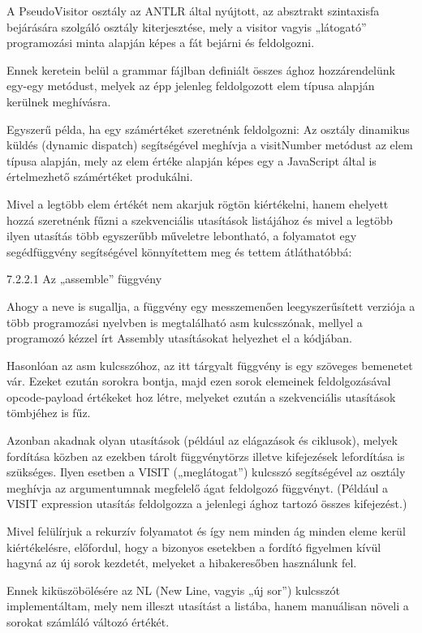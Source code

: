 A PseudoVisitor osztály az ANTLR által nyújtott, az absztrakt szintaxisfa bejárására szolgáló osztály kiterjesztése, mely a visitor vagyis „látogató” programozási minta alapján képes a fát bejárni és feldolgozni.

Ennek keretein belül a grammar fájlban definiált összes ághoz hozzárendelünk egy-egy metódust, melyek az épp jelenleg feldolgozott elem típusa alapján kerülnek meghívásra.

Egyszerű példa, ha egy számértéket szeretnénk feldolgozni: Az osztály dinamikus küldés (dynamic dispatch) segítségével meghívja a visitNumber metódust az elem típusa alapján, mely az elem értéke alapján képes egy a JavaScript által is értelmezhető számértéket produkálni.

Mivel a legtöbb elem értékét nem akarjuk rögtön kiértékelni, hanem ehelyett hozzá szeretnénk fűzni a szekvenciális utasítások listájához és mivel a legtöbb ilyen utasítás több egyszerűbb műveletre lebontható, a folyamatot egy segédfüggvény segítségével könnyítettem meg és tettem átláthatóbbá:

7.2.2.1 Az „assemble” függvény

Ahogy a neve is sugallja, a függvény egy messzemenően leegyszerűsített verziója a több programozási nyelvben is megtalálható asm kulcsszónak, mellyel a programozó kézzel írt Assembly utasításokat helyezhet el a kódjában.

Hasonlóan az asm kulcsszóhoz, az itt tárgyalt függvény is egy szöveges bemenetet vár. Ezeket ezután sorokra bontja, majd ezen sorok elemeinek feldolgozásával opcode-payload értékeket hoz létre, melyeket ezután a szekvenciális utasítások tömbjéhez is fűz.

Azonban akadnak olyan utasítások (például az elágazások és ciklusok), melyek fordítása közben az ezekben tárolt függvénytörzs illetve kifejezések lefordítása is szükséges. Ilyen esetben a VISIT („meglátogat”) kulcsszó segítségével az osztály meghívja az argumentumnak megfelelő ágat feldolgozó függvényt. (Például a VISIT expression utasítás feldolgozza a jelenlegi ághoz tartozó összes kifejezést.)

Mivel felülírjuk a rekurzív folyamatot és így nem minden ág minden eleme kerül kiértékelésre, előfordul, hogy a bizonyos esetekben a fordító figyelmen kívül hagyná az új sorok kezdetét, melyeket a hibakeresőben használunk fel.

Ennek kiküszöbölésére az NL (New Line, vagyis „új sor”) kulcsszót implementáltam, mely nem illeszt utasítást a listába, hanem manuálisan növeli a sorokat számláló változó értékét.

